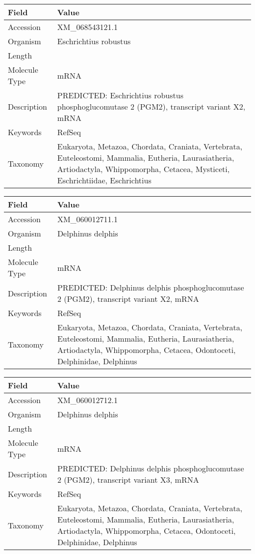 \documentclass[10pt]{article}
\begin{document}
{\footnotesize
\begin{longtable}{>{\raggedright\arraybackslash}p{4.5cm} >{\raggedright\arraybackslash}p{11.5cm}}
\textbf{Field} & \textbf{Value} \\
\hline
Accession & XM\_068543121.1 \\
Organism & Eschrichtius robustus \\
Length & 4131 \\
Molecule Type & mRNA \\
Description & PREDICTED: Eschrichtius robustus phosphoglucomutase 2 (PGM2), transcript variant X2, mRNA \\
Keywords & RefSeq \\
Taxonomy & Eukaryota, Metazoa, Chordata, Craniata, Vertebrata, Euteleostomi, Mammalia, Eutheria, Laurasiatheria, Artiodactyla, Whippomorpha, Cetacea, Mysticeti, Eschrichtiidae, Eschrichtius \\
\end{longtable}
}

{\footnotesize
\begin{longtable}{>{\raggedright\arraybackslash}p{4.5cm} >{\raggedright\arraybackslash}p{11.5cm}}
\textbf{Field} & \textbf{Value} \\
\hline
Accession & XM\_060012711.1 \\
Organism & Delphinus delphis \\
Length & 6836 \\
Molecule Type & mRNA \\
Description & PREDICTED: Delphinus delphis phosphoglucomutase 2 (PGM2), transcript variant X2, mRNA \\
Keywords & RefSeq \\
Taxonomy & Eukaryota, Metazoa, Chordata, Craniata, Vertebrata, Euteleostomi, Mammalia, Eutheria, Laurasiatheria, Artiodactyla, Whippomorpha, Cetacea, Odontoceti, Delphinidae, Delphinus \\
\end{longtable}
}

{\footnotesize
\begin{longtable}{>{\raggedright\arraybackslash}p{4.5cm} >{\raggedright\arraybackslash}p{11.5cm}}
\textbf{Field} & \textbf{Value} \\
\hline
Accession & XM\_060012712.1 \\
Organism & Delphinus delphis \\
Length & 6705 \\
Molecule Type & mRNA \\
Description & PREDICTED: Delphinus delphis phosphoglucomutase 2 (PGM2), transcript variant X3, mRNA \\
Keywords & RefSeq \\
Taxonomy & Eukaryota, Metazoa, Chordata, Craniata, Vertebrata, Euteleostomi, Mammalia, Eutheria, Laurasiatheria, Artiodactyla, Whippomorpha, Cetacea, Odontoceti, Delphinidae, Delphinus \\
\end{longtable}
}
\end{document}

